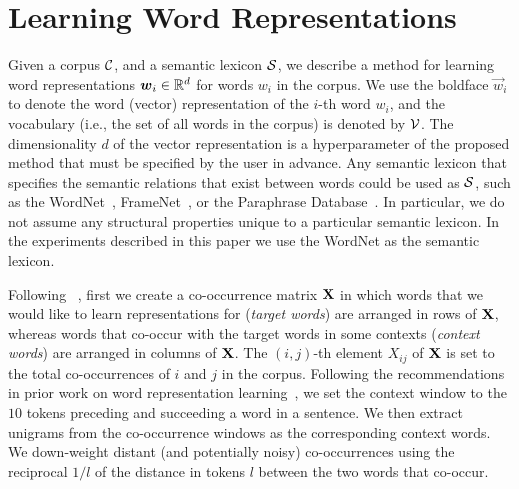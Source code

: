 \documentclass[letterpaper]{article}
\newcommand{\citet}[1]{\citeauthor{#1} \shortcite{#1}}
\newcommand{\citep}{\cite}
\begin{document}
\section{Learning Word Representations}
\label{sec:method}

Given a corpus $\mathcal{C}$, and a semantic lexicon $\mathcal{S}$, we describe a method for learning
word representations $\boldsymbol{w}_i \in \mathbb{R}^d$ for words $w_i$ in the corpus.
We use the boldface $\vec{w}_i$ to denote the word (vector) representation of
the $i$-th word $w_i$, and the vocabulary (i.e., the set of all words in the corpus) is denoted by $\mathcal{V}$.
The dimensionality $d$ of the vector representation is a hyperparameter of the proposed method that must be
specified by the user in advance.  Any semantic lexicon that specifies the semantic relations that exist between words could be used as $\mathcal{S}$,
such as the WordNet~\citep{WordNet}, FrameNet~\citep{baker-fillmore-lowe:1998:ACLCOLING}, or the Paraphrase Database~\citep{ganitkevitch-vandurme-callisonburch:2013:NAACL-HLT}. In particular, we do not assume any structural properties unique to a particular semantic lexicon. In the experiments described in this paper we use the WordNet as the semantic lexicon.

Following~\citet{Pennington:EMNLP:2014}, first we create a co-occurrence matrix $\text{\bf X}$ in which
words that we would like to learn representations for (\emph{target words}) are arranged in rows of $\text{\bf X}$, whereas words
that co-occur with the target words in some contexts (\emph{context words}) are arranged in columns of $\text{\bf X}$.
The $(i,j)$-th element $X_{ij}$ of $\text{\bf X}$ is set to the total co-occurrences of $i$ and $j$ in the corpus.
Following the recommendations in prior work on word representation learning~\citep{Levy:TACL:2015},
we set the context window to the $10$ tokens preceding and succeeding a word in a sentence.
We then extract unigrams from the co-occurrence windows
 as the corresponding context words. We down-weight distant (and potentially noisy) co-occurrences
 using the reciprocal $1/l$ of the distance in tokens $l$ between the two words that co-occur.
\end{document}

